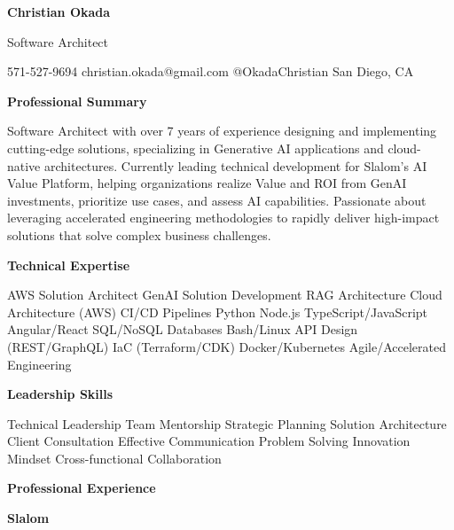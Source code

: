 \documentclass[11pt,letterpaper]{article}
\newcommand{\sectionheader}[1]{%
    \vspace{12pt}
    {\headingfont\Large\color{primaryblue}\textbf{#1}}
    \vspace{3pt}
    \par\noindent{\color{primaryblue}\rule{\textwidth}{1.5pt}}
    \vspace{6pt}
}
\newcommand{\companyHeader}[1]{%
    {\headingfont\large\color{primaryblue}\textbf{#1}}
    \vspace{4pt}
}
\begin{document}
\begin{center}
    {\headingfont\Huge\color{primaryblue}\textbf{Christian Okada}}
    \vspace{4pt}

    {\headingfont\large\color{darkgray}Software Architect}
    \vspace{8pt}

    {\color{mediumgray}
    571-527-9694 \textbullet{} christian.okada@gmail.com \textbullet{} @OkadaChristian \textbullet{} San Diego, CA
    }
\end{center}

\vspace{4pt}

\sectionheader{Professional Summary}
\color{darkgray}
Software Architect with over 7 years of experience designing and implementing cutting-edge solutions, specializing in Generative AI applications and cloud-native architectures. Currently leading technical development for Slalom's AI Value Platform, helping organizations realize Value and ROI from GenAI investments, prioritize use cases, and assess AI capabilities. Passionate about leveraging accelerated engineering methodologies to rapidly deliver high-impact solutions that solve complex business challenges.

\sectionheader{Technical Expertise}
\color{darkgray}\small
AWS Solution Architect \textbullet{} GenAI Solution Development \textbullet{} RAG Architecture \textbullet{} Cloud Architecture (AWS) \textbullet{} CI/CD Pipelines \textbullet{} Python \textbullet{} Node.js \textbullet{} TypeScript/JavaScript \textbullet{} Angular/React \textbullet{} SQL/NoSQL Databases \textbullet{} Bash/Linux \textbullet{} API Design (REST/GraphQL) \textbullet{} IaC (Terraform/CDK) \textbullet{} Docker/Kubernetes \textbullet{} Agile/Accelerated Engineering

\sectionheader{Leadership Skills}
\color{darkgray}\small
Technical Leadership \textbullet{} Team Mentorship \textbullet{} Strategic Planning \textbullet{} Solution Architecture \textbullet{} Client Consultation \textbullet{} Effective Communication \textbullet{} Problem Solving \textbullet{} Innovation Mindset \textbullet{} Cross-functional Collaboration

\sectionheader{Professional Experience}

\companyHeader{Slalom}
\end{document}
